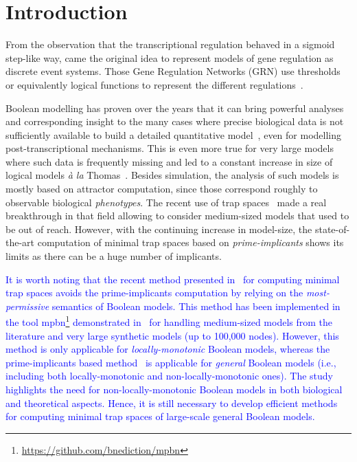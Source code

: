 \documentclass[runningheads]{llncs}
\newcommand{\revise}[1]{\textcolor{blue}{#1}}
\begin{document}
\section{Introduction}

From the observation that the transcriptional regulation behaved in a sigmoid step-like way, came the original idea to represent models of gene regulation as discrete event systems.
Those Gene Regulation Networks (GRN) use thresholds or equivalently logical functions to represent the different regulations~\cite{glass1973logical,thomas1973boolean,thomas1990biological,thomas1991regulatory}.

Boolean modelling has proven over the years that it can bring powerful analyses and corresponding insight to the many cases where precise biological data is not sufficiently available to build a detailed quantitative model~\cite{wang2012boolean}, even for modelling post-transcriptional mechanisms.
This is even more true for very large models where such data is frequently missing and led to a constant increase in size of logical models \emph{à la} Thomas~\cite{aghamiri2020automated}.
Besides simulation, the analysis of such models is mostly based on attractor computation, since those correspond roughly to observable biological \emph{phenotypes}.
The recent use of trap spaces~\cite{klarner2015computing} made a real breakthrough in that field allowing to consider medium-sized models that used to be out of reach.
However, with the continuing increase in model-size, the state-of-the-art computation of minimal trap spaces based on \emph{prime-implicants} shows its limits as there can be a huge number of implicants.

\revise{It is worth noting that the recent method presented in~\cite{DBLP:conf/ictai/ChevalierFPZ19} for computing minimal trap spaces avoids the prime-implicants computation by relying on the \emph{most-permissive} semantics of Boolean models.
This method has been implemented in the tool mpbn\footnote{\url{https://github.com/bnediction/mpbn}} demonstrated in~\cite{Paulev2020} for handling medium-sized models from the literature and very large synthetic models (up to 100,000 nodes).
However, this method is only applicable for \emph{locally-monotonic} Boolean models, whereas the prime-implicants based method~\cite{klarner2015computing} is applicable for \emph{general} Boolean models (i.e., including both locally-monotonic and non-locally-monotonic ones).
The study~\cite{DBLP:journals/tcs/NoualRS13} highlights the need for non-locally-monotonic Boolean models in both biological and theoretical aspects.
Hence, it is still necessary to develop efficient methods for computing minimal trap spaces of large-scale general Boolean models.
}
\end{document}
